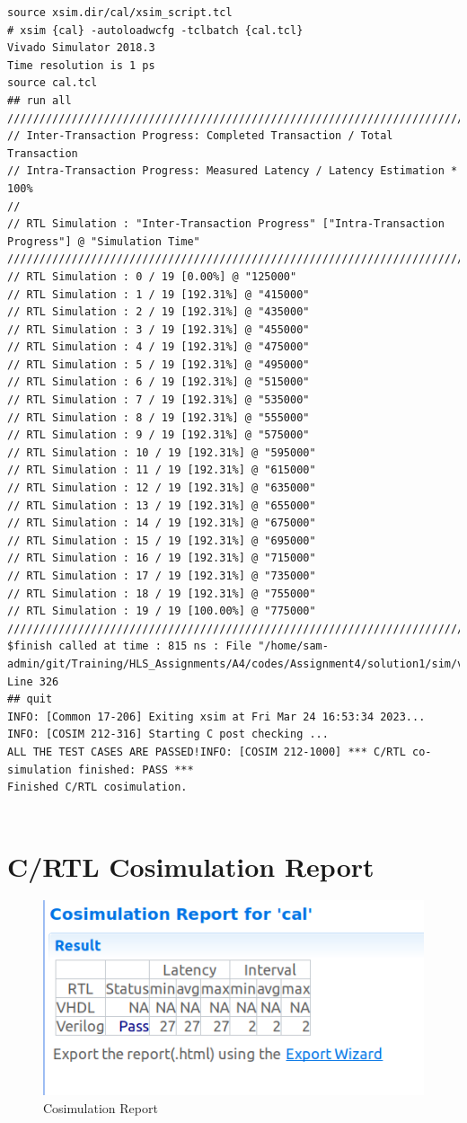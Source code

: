 \documentclass{article}
\begin{document}
\begin{lstlisting}
source xsim.dir/cal/xsim_script.tcl
# xsim {cal} -autoloadwcfg -tclbatch {cal.tcl}
Vivado Simulator 2018.3
Time resolution is 1 ps
source cal.tcl
## run all
////////////////////////////////////////////////////////////////////////////////////
// Inter-Transaction Progress: Completed Transaction / Total Transaction
// Intra-Transaction Progress: Measured Latency / Latency Estimation * 100%
//
// RTL Simulation : "Inter-Transaction Progress" ["Intra-Transaction Progress"] @ "Simulation Time"
////////////////////////////////////////////////////////////////////////////////////
// RTL Simulation : 0 / 19 [0.00%] @ "125000"
// RTL Simulation : 1 / 19 [192.31%] @ "415000"
// RTL Simulation : 2 / 19 [192.31%] @ "435000"
// RTL Simulation : 3 / 19 [192.31%] @ "455000"
// RTL Simulation : 4 / 19 [192.31%] @ "475000"
// RTL Simulation : 5 / 19 [192.31%] @ "495000"
// RTL Simulation : 6 / 19 [192.31%] @ "515000"
// RTL Simulation : 7 / 19 [192.31%] @ "535000"
// RTL Simulation : 8 / 19 [192.31%] @ "555000"
// RTL Simulation : 9 / 19 [192.31%] @ "575000"
// RTL Simulation : 10 / 19 [192.31%] @ "595000"
// RTL Simulation : 11 / 19 [192.31%] @ "615000"
// RTL Simulation : 12 / 19 [192.31%] @ "635000"
// RTL Simulation : 13 / 19 [192.31%] @ "655000"
// RTL Simulation : 14 / 19 [192.31%] @ "675000"
// RTL Simulation : 15 / 19 [192.31%] @ "695000"
// RTL Simulation : 16 / 19 [192.31%] @ "715000"
// RTL Simulation : 17 / 19 [192.31%] @ "735000"
// RTL Simulation : 18 / 19 [192.31%] @ "755000"
// RTL Simulation : 19 / 19 [100.00%] @ "775000"
////////////////////////////////////////////////////////////////////////////////////
$finish called at time : 815 ns : File "/home/sam-admin/git/Training/HLS_Assignments/A4/codes/Assignment4/solution1/sim/verilog/cal.autotb.v" Line 326
## quit
INFO: [Common 17-206] Exiting xsim at Fri Mar 24 16:53:34 2023...
INFO: [COSIM 212-316] Starting C post checking ...
ALL THE TEST CASES ARE PASSED!INFO: [COSIM 212-1000] *** C/RTL co-simulation finished: PASS ***
Finished C/RTL cosimulation.


\end{lstlisting}
\vspace{5cm}


\section{C/RTL Cosimulation Report}
\vspace{1cm}
\begin{figure}[h]
    \centering
\includegraphics[width=\columnwidth]{figs/4.png}
    \caption{Cosimulation Report}
    \label{fig:my_label}
\end{figure}
\end{document}
